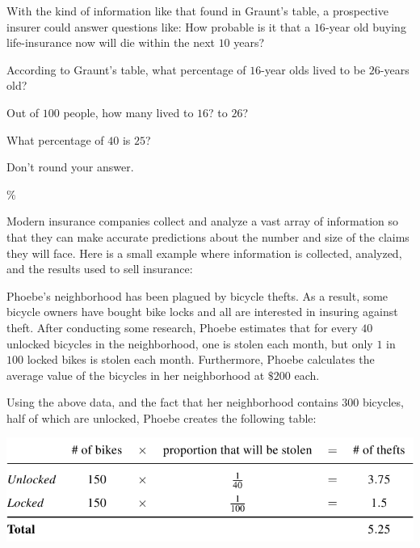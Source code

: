 \documentclass{ximera}
\begin{document}
With the kind of information like that found in Graunt's table, a prospective insurer could answer questions like: How probable is it that a $16$-year old buying life-insurance now will die within the next $10$ years?

\begin{question}
According to Graunt's table, what percentage of $16$-year olds lived to be $26$-years old?

\begin{hint}
Out of $100$ people, how many lived to $16$? to $26$?
\end{hint}
\begin{hint}
What percentage of $40$ is $25$? 
\end{hint}
\begin{hint}
Don't round your answer.
\end{hint}
$\%$
	
\end{question}

Modern insurance companies collect and analyze a vast array of information so that they can make accurate predictions about the number and size of the claims they will face. Here is a small example where information is collected, analyzed, and the results used to sell insurance:

Phoebe's neighborhood has been plagued by bicycle thefts. As a result, some bicycle owners have bought bike locks and all are interested in insuring against theft. After conducting some research, Phoebe estimates that for every $40$ unlocked bicycles in the neighborhood, one is stolen each month, but only $1$ in $100$ locked bikes is stolen each month. Furthermore, Phoebe calculates the average value of the bicycles in her neighborhood at $\$200$ each.

Using the above data, and the fact that her neighborhood contains $300$ bicycles, half of which are unlocked, Phoebe creates the following table:

\begin{center}
\includegraphics[scale=1.5]{InsuranceTable2.png}
\end{center}
\end{document}

